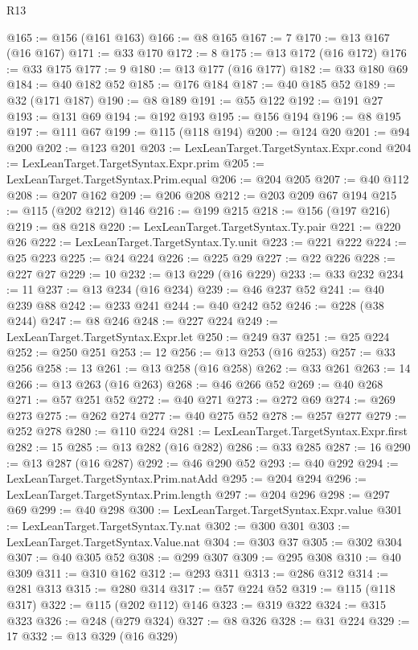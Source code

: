 \begin{lexlean}{R13}
\begin{coremodule}
@165 := @156 (@161 @163)
@166 := @8 @165
@167 := 7
@170 := @13 @167 (@16 @167)
@171 := @33 @170
@172 := 8
@175 := @13 @172 (@16 @172)
@176 := @33 @175
@177 := 9
@180 := @13 @177 (@16 @177)
@182 := @33 @180 @69
@184 := @40 @182 @52
@185 := @176 @184
@187 := @40 @185 @52
@189 := @32 (@171 @187)
@190 := @8 @189
@191 := @55 @122
@192 := @191 @27
@193 := @131 @69
@194 := @192 @193
@195 := @156 @194
@196 := @8 @195
@197 := @111 @67
@199 := @115 (@118 @194)
@200 := @124 @20
@201 := @94 @200
@202 := @123 @201
@203 := LexLeanTarget.TargetSyntax.Expr.cond
@204 := LexLeanTarget.TargetSyntax.Expr.prim
@205 := LexLeanTarget.TargetSyntax.Prim.equal
@206 := @204 @205
@207 := @40 @112
@208 := @207 @162
@209 := @206 @208
@212 := @203 @209 @67 @194
@215 := @115 (@202 @212) @146
@216 := @199 @215
@218 := @156 (@197 @216)
@219 := @8 @218
@220 := LexLeanTarget.TargetSyntax.Ty.pair
@221 := @220 @26
@222 := LexLeanTarget.TargetSyntax.Ty.unit
@223 := @221 @222
@224 := @25 @223
@225 := @24 @224
@226 := @225 @29
@227 := @22 @226
@228 := @227 @27
@229 := 10
@232 := @13 @229 (@16 @229)
@233 := @33 @232
@234 := 11
@237 := @13 @234 (@16 @234)
@239 := @46 @237 @52
@241 := @40 @239 @88
@242 := @233 @241
@244 := @40 @242 @52
@246 := @228 (@38 @244)
@247 := @8 @246
@248 := @227 @224
@249 := LexLeanTarget.TargetSyntax.Expr.let
@250 := @249 @37
@251 := @25 @224
@252 := @250 @251
@253 := 12
@256 := @13 @253 (@16 @253)
@257 := @33 @256
@258 := 13
@261 := @13 @258 (@16 @258)
@262 := @33 @261
@263 := 14
@266 := @13 @263 (@16 @263)
@268 := @46 @266 @52
@269 := @40 @268
@271 := @57 @251 @52
@272 := @40 @271
@273 := @272 @69
@274 := @269 @273
@275 := @262 @274
@277 := @40 @275 @52
@278 := @257 @277
@279 := @252 @278
@280 := @110 @224
@281 := LexLeanTarget.TargetSyntax.Expr.first
@282 := 15
@285 := @13 @282 (@16 @282)
@286 := @33 @285
@287 := 16
@290 := @13 @287 (@16 @287)
@292 := @46 @290 @52
@293 := @40 @292
@294 := LexLeanTarget.TargetSyntax.Prim.natAdd
@295 := @204 @294
@296 := LexLeanTarget.TargetSyntax.Prim.length
@297 := @204 @296
@298 := @297 @69
@299 := @40 @298
@300 := LexLeanTarget.TargetSyntax.Expr.value
@301 := LexLeanTarget.TargetSyntax.Ty.nat
@302 := @300 @301
@303 := LexLeanTarget.TargetSyntax.Value.nat
@304 := @303 @37
@305 := @302 @304
@307 := @40 @305 @52
@308 := @299 @307
@309 := @295 @308
@310 := @40 @309
@311 := @310 @162
@312 := @293 @311
@313 := @286 @312
@314 := @281 @313
@315 := @280 @314
@317 := @57 @224 @52
@319 := @115 (@118 @317)
@322 := @115 (@202 @112) @146
@323 := @319 @322
@324 := @315 @323
@326 := @248 (@279 @324)
@327 := @8 @326
@328 := @31 @224
@329 := 17
@332 := @13 @329 (@16 @329)

\end{coremodule}
\end{lexlean}
